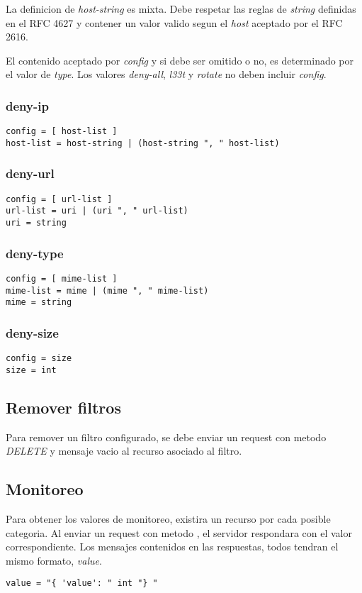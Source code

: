 \documentclass[11pt,a4paper,titlepage]{article}
\begin{document}
La definicion de \textit{host-string} es mixta.
Debe respetar las reglas de \textit{string} definidas en el RFC 4627 y contener un valor valido segun el \textit{host} aceptado por el RFC 2616.

El contenido aceptado por \textit{config} y si debe ser omitido o no, es determinado por el valor de \textit{type}.
Los valores \textit{deny-all}, \textit{l33t} y \textit{rotate} no deben incluir \textit{config}.
\subsubsection{deny-ip}
\begin{verbatim}
config = [ host-list ]
host-list = host-string | (host-string ", " host-list)
\end{verbatim}

\subsubsection{deny-url}
\begin{verbatim}
config = [ url-list ]
url-list = uri | (uri ", " url-list)
uri = string
\end{verbatim}

\subsubsection{deny-type}
\begin{verbatim}
config = [ mime-list ]
mime-list = mime | (mime ", " mime-list)
mime = string
\end{verbatim}

\subsubsection{deny-size}
\begin{verbatim}
config = size
size = int
\end{verbatim}

\subsection{Remover filtros}
Para remover un filtro configurado, se debe enviar un request con metodo \textit{DELETE} y mensaje vacio al recurso asociado al filtro.

\subsection{Monitoreo}
Para obtener los valores de monitoreo, existira un recurso por cada posible categoria.
Al enviar un request con metodo , el servidor respondara con el valor correspondiente.
Los mensajes contenidos en las respuestas, todos tendran el mismo formato, \textit{value}.
\begin{verbatim}
value = "{ 'value': " int "} "
\end{verbatim}
\end{document}
